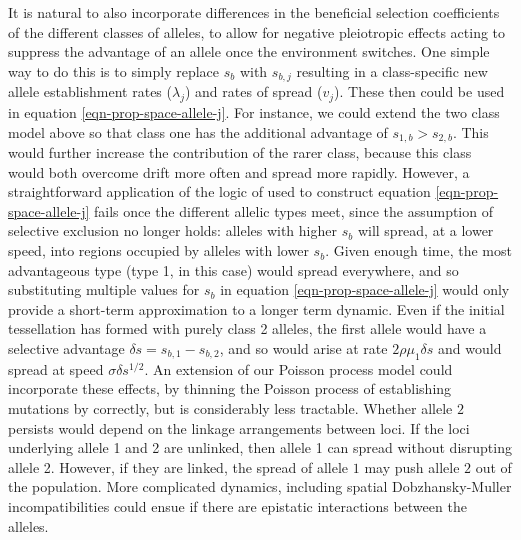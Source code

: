 \documentclass{article}
\begin{document}
It is natural to also incorporate differences in the beneficial selection coefficients of the different classes of alleles, 
to allow for negative pleiotropic effects acting to suppress the advantage of an allele once the environment switches.
One simple way to do this is to simply replace $s_b$ with $s_{b,j}$ 
resulting in a class-specific new allele establishment rates ($\lambda_{j}$) and rates of spread ($v_j$).
These then could be used in equation \eqref{eqn-prop-space-allele-j}. 
For instance, we could extend the two class model above 
so that class one has the additional advantage of $s_{1,b}>s_{2,b}$. 
This would further increase the contribution of the rarer class,
because this class would both overcome drift more often and spread more rapidly. 
However, a straightforward application of the logic of used to construct equation \eqref{eqn-prop-space-allele-j}
fails once the different allelic types meet,
since the assumption of selective exclusion no longer holds:
alleles with higher $s_b$ will spread, at a lower speed, into regions occupied by alleles with lower $s_b$.
Given enough time, the most advantageous type (type 1, in this case) would spread everywhere, 
and so substituting multiple values for $s_b$ in equation \eqref{eqn-prop-space-allele-j}
would only provide a short-term approximation to a longer term dynamic. 
Even if the initial tessellation has formed with purely class 2 alleles, 
the first allele would have a selective advantage $\delta s =s_{b,1}-s_{b,2}$,
and so would arise at rate $2\rho \mu_1 \delta s $ and would spread at
speed $\sigma \delta s^{1/2}$. 
An extension of our Poisson process model could incorporate these effects, 
by thinning the Poisson process of establishing mutations by correctly,
but is considerably less tractable.
Whether allele $2$ persists would depend on the linkage arrangements between loci. 
If the loci underlying allele 1 and 2 are unlinked, then allele 1 can spread without disrupting allele 2. 
However, if they are linked, the spread of allele $1$ may push allele $2$ out of the population. 
More complicated dynamics,
including spatial Dobzhansky-Muller incompatibilities \citep{Kondrashov:03,ralphcoop2010} 
could ensue if there are epistatic interactions between the alleles. 

\end{document}
